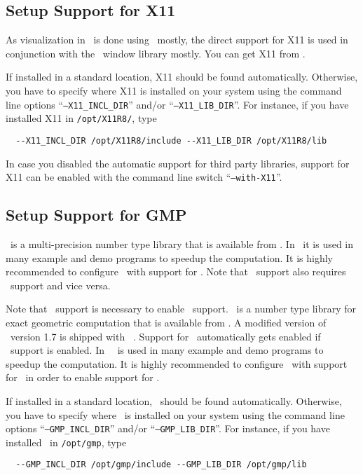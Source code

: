 \subsection{Setup Support for X11\label{sec:x11-setup}}

As visualization in \cgal\ is done using \qt\ mostly, the direct
support for X11 is used in conjunction with the \leda\ window library
mostly. You can get X11 from \xpage.

If installed in a standard location, X11 should be found
automatically. Otherwise, you have to specify where X11 is installed
on your system using the command line options
``\texttt{--X11\_INCL\_DIR}'' and/or ``\texttt{--X11\_LIB\_DIR}''. For
instance, if you have installed X11 in \texttt{/opt/X11R8/}, type
\begin{verbatim}
  --X11_INCL_DIR /opt/X11R8/include --X11_LIB_DIR /opt/X11R8/lib
\end{verbatim}

In case you disabled the automatic support for third party libraries,
support for X11 can be enabled with the command line switch
``\texttt{--with-X11}''.

\subsection{Setup Support for GMP\label{sec:gmp-setup}}

\gmp\ is a multi-precision number type library that is available from
\gmppage. In \cgal\ it is used in many example and demo programs to
speedup the computation. It is highly recommended to configure \cgal\
with support for \gmp. Note that \gmp\ support also requires \mpfr\
support and vice versa.

Note that \gmp\ support is necessary to enable \core\ support.
\core\ is a number type library for exact geometric computation that
is available from \corepage. A modified version of \core\ version 1.7
is shipped with \cgal~\cgalrelease. Support for \core\ automatically
gets enabled if \gmp\ support is enabled. In \cgal\, \core\ is used
in many example and demo programs to speedup the computation. It is
highly recommended to configure \cgal\ with support for \gmp\ in order
to enable support for \core.

If installed in a standard location, \gmp\ should be
found automatically. Otherwise, you have to specify where \gmp\ is
installed on your system using the command line options
``\texttt{--GMP\_INCL\_DIR}'' and/or ``\texttt{--GMP\_LIB\_DIR}''. For
instance, if you have installed \gmp\ in \texttt{/opt/gmp}, type
\begin{verbatim}
  --GMP_INCL_DIR /opt/gmp/include --GMP_LIB_DIR /opt/gmp/lib
\end{verbatim}

